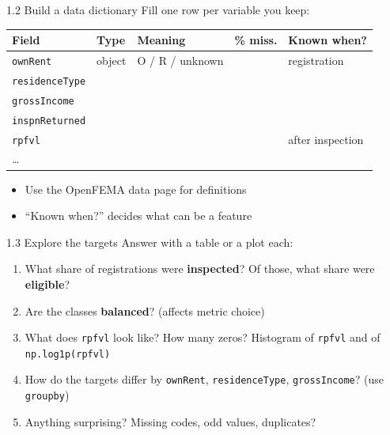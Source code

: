 \documentclass[aspectratio=43,11pt]{beamer}
\begin{document}
\begin{frame}{1.2 Build a data dictionary}
  Fill one row per variable you keep:
  \vspace{0.5em}
  \begin{center}
  \footnotesize
  \begin{tabular}{@{}lllll@{}}
    \toprule
    Field & Type & Meaning & \% miss. & Known when? \\
    \midrule
    \texttt{ownRent} & object & O / R / unknown & & registration \\
    \texttt{residenceType} & & & & \\
    \texttt{grossIncome} & & & & \\
    \texttt{inspnReturned} & & & & \\
    \texttt{rpfvl} & & & & after inspection \\
    \dots & & & & \\
    \bottomrule
  \end{tabular}
  \end{center}
  \vspace{0.5em}
  \begin{itemize}
    \item Use the OpenFEMA data page for definitions
    \item ``Known when?'' decides what can be a feature
  \end{itemize}
\end{frame}

\begin{frame}{1.3 Explore the targets}
  Answer with a table or a plot each:
  \vspace{0.5em}
  \begin{enumerate}
    \item What share of registrations were \textbf{inspected}?
          Of those, what share were \textbf{eligible}?
    \item Are the classes \textbf{balanced}? (affects metric choice)
    \item What does \texttt{rpfvl} look like?
          How many zeros? Histogram of \texttt{rpfvl} and of
          \texttt{np.log1p(rpfvl)}
    \item How do the targets differ by \texttt{ownRent},
          \texttt{residenceType}, \texttt{grossIncome}?
          (use \texttt{groupby})
    \item Anything surprising? Missing codes, odd values, duplicates?
  \end{enumerate}
\end{frame}
\end{document}
